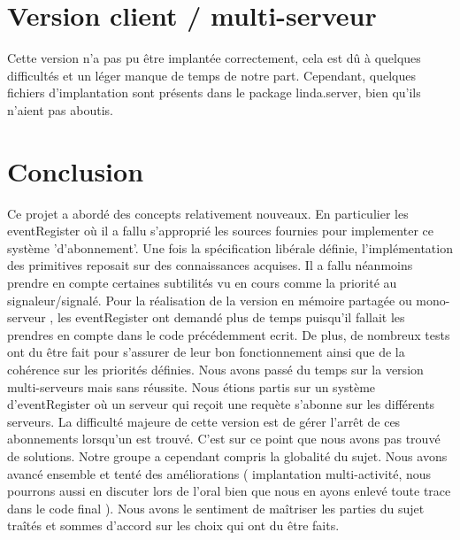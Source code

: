 \documentclass{report}
\begin{document}
\chapter{Version client / multi-serveur}

Cette version n'a pas pu être implantée correctement, cela est dû à quelques difficultés et un léger manque de temps de notre part. Cependant, quelques fichiers d'implantation sont présents dans le package
linda.server, bien qu'ils n'aient pas aboutis.

\chapter{Conclusion}

	Ce projet a abordé des concepts relativement nouveaux. En particulier les eventRegister où il a
fallu s'approprié les sources fournies pour implementer ce système 'd'abonnement'. Une fois
la spécification libérale définie, l'implémentation des primitives reposait sur des connaissances
acquises. Il a fallu néanmoins prendre en compte certaines subtilités vu en cours comme la priorité
au signaleur/signalé. Pour la réalisation de la version en mémoire partagée ou mono-serveur , les eventRegister
ont demandé plus de temps puisqu'il fallait les prendres en compte dans le code précédemment ecrit. De 
plus, de nombreux tests ont du être fait pour s'assurer de leur bon fonctionnement ainsi que de la 
cohérence sur les priorités définies.
	Nous avons passé du temps sur la version multi-serveurs mais sans réussite. Nous étions partis sur
un système d'eventRegister où un serveur qui reçoit une requète s'abonne sur les différents serveurs.
La difficulté majeure de cette version est de gérer l'arrêt de ces abonnements lorsqu'un est trouvé.
C'est sur ce point que nous avons pas trouvé de solutions.
	Notre groupe a cependant compris la globalité du sujet. Nous avons avancé ensemble et tenté des
améliorations ( implantation multi-activité, nous pourrons aussi en discuter lors de l'oral bien que nous en ayons enlevé toute trace dans le code final ). Nous avons le sentiment de maîtriser les parties du
sujet traîtés et sommes d'accord sur les choix qui ont du être faits.
\end{document}
